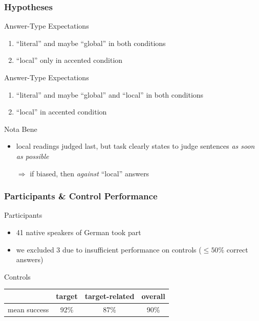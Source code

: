 \documentclass[fleqn,10pt,serif,xcolor=dvipsnames]{beamer}
\newcommand{\mymark}[1]{{\color{blue}{#1}}}
\begin{document}
\begin{frame}
  \frametitle{Hypotheses}

  \begin{block}{\mymark{Traditionalist} Answer-Type Expectations}
    \begin{enumerate}
    \item ``literal'' and maybe ``global'' in both conditions
    \item ``local'' only in accented condition
    \end{enumerate}
  \end{block}

  \begin{block}{\mymark{Heretic} Answer-Type Expectations}
    \begin{enumerate}
    \item ``literal'' and maybe ``global'' and
      ``local'' in both conditions
    \item ``local'' in accented condition
    \end{enumerate}
  \end{block}

  \begin{block}{Nota Bene}
    \begin{itemize}
    \item local readings judged last, but task clearly states to judge
      sentences \emph{as soon as possible}
    \item[$\Rightarrow$] if biased, then \emph{against} ``local'' answers
    \end{itemize}
  \end{block}

\end{frame}

\begin{frame}
  \frametitle{Participants \& Control Performance}

  \begin{block}{Participants}
    \begin{itemize}
    \item 41 native speakers of German took part
    \item we excluded 3 due to insufficient performance on controls
      ($\le 50\%$ correct answers)
    \end{itemize}
  \end{block}

  \begin{block}{Controls}
        \begin{center}
      \begin{tabular}{lccc}
        & target & target-related & overall \\ \midrule
        mean success & 92\% & 87\% & 90\% \\
      \end{tabular}
    \end{center}
  \end{block}
  

\end{frame}
\end{document}
